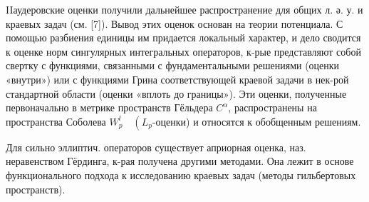 \documentclass[10pt]{article}
\begin{document}
IIаудеровские оценки получили дальнейшее распространение для общих л. ә. у. и краевых задач (см. [7]). Вывод этих оценок основан на теории потенциала. С помощью разбиения единицы им придается локальный характер, и дело сводится к оценке норм сингулярных интегральных операторов, к-рые представляют собой свертку с функциями, связанными с фундаментальными решениями (оценки «внутри») или с функциями Грина соответствующей краевой задачи в нек-рой стандартной области (оценки «вплоть до границы»). Эти оценки, полученные первоначально в метрике пространств Гёльдера $C^{\alpha}$, распространены на пространства Соболева $W_{p}^{l} \quad\left(L_{p}\right.$-оценки) и относятся к обобщенным решениям.



Для сильно эллиптич. операторов существует априорная оценка, наз. неравенством Гёрдинга, к-рая получена другими методами. Она лежит в основе функционального подхода к исследованию краевых задач (методы гильбертовых пространств).
\end{document}
